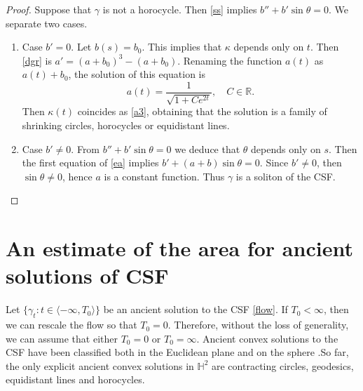 \documentclass[12pt]{amsart}
\theoremstyle{plain}
\theoremstyle{definition}
\def\h{\mathbb H}
\def\r{\mathbb R}
\begin{document}
\begin{proof}
Suppose that $\gamma$ is not a horocycle. Then \eqref{ss} implies 
$ b''+b'\sin\theta=0$.  We separate two cases.
\begin{enumerate}
\item Case $b'=0$. Let $b(s)=b_0$. This implies that $\kappa$ depends only on $t$. Then \eqref{dgr} is 
$a'=(a+b_0)^3-(a+b_0)$. Renaming the function $a(t)$ as $a(t)+b_0$, the solution of this equation is 
$$a(t)=\frac{1}{\sqrt{1+Ce^{2 t }}},\quad C\in\r.$$
Then $\kappa(t)$ coincides as \eqref{a3}, obtaining  that  the solution   is a  family of shrinking circles, horocycles or  equidistant lines. 
\item Case $b'\not=0$. From $ b''+b'\sin\theta=0$ we deduce that $\theta$ depends only on $s$. Then the first equation of \eqref{ea} implies $b'+(a+b)\sin\theta=0$. Since $b'\not=0$, then $\sin\theta\not=0$, hence $a$ is a constant function. Thus $\gamma$ is a soliton of the CSF.
\end{enumerate}
\end{proof}
 

\section{An estimate of the area for ancient solutions of CSF}\label{sec5}

 
Let $\{ \gamma_t \colon t \in \langle -\infty, T_0 \rangle \}$ be an ancient solution to the CSF \eqref{flow}. If $T_0 < \infty$,  then we can rescale the flow so that $T_0 = 0$. Therefore, without the loss of generality, we can assume that either $T_0 = 0$ or $T_0 = \infty$. Ancient convex solutions to the CSF have been classified both in the Euclidean plane and on the sphere  \cite{blt,bl}.So far, the only explicit ancient convex solutions in $\h^2$ are contracting circles, geodesics, equidistant lines and horocycles. 
\end{document}
